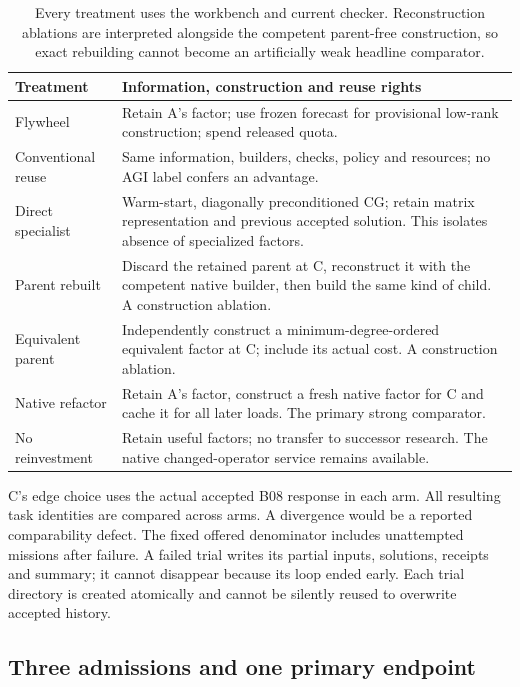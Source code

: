 \begin{table}[htbp]\centering\small
\begin{tabularx}{\linewidth}{@{}L{31mm}Y@{}}\toprule
Treatment & Information, construction and reuse rights \\\midrule
Flywheel & Retain A's factor; use frozen forecast for provisional low-rank construction; spend released quota. \\
Conventional reuse & Same information, builders, checks, policy and resources; no AGI label confers an advantage. \\
Direct specialist & Warm-start, diagonally preconditioned CG; retain matrix representation and previous accepted solution. This isolates absence of specialized factors. \\
Parent rebuilt & Discard the retained parent at C, reconstruct it with the competent native builder, then build the same kind of child. A construction ablation. \\
Equivalent parent & Independently construct a minimum-degree-ordered equivalent factor at C; include its actual cost. A construction ablation. \\
Native refactor & Retain A's factor, construct a fresh native factor for C and cache it for all later loads. The primary strong comparator. \\
No reinvestment & Retain useful factors; no transfer to successor research. The native changed-operator service remains available. \\\bottomrule
\end{tabularx}
\caption{Every treatment uses the workbench and current checker. Reconstruction ablations are interpreted alongside
the competent parent-free construction, so exact rebuilding cannot become an artificially weak headline comparator.}
\end{table}

C's edge choice uses the actual accepted B08 response in each arm. All resulting task identities are compared
across arms. A divergence would be a reported comparability defect. The fixed offered denominator includes
unattempted missions after failure. A failed trial writes its partial inputs, solutions, receipts and summary;
it cannot disappear because its loop ended early. Each trial directory is created atomically and cannot be
silently reused to overwrite accepted history.

\subsection{Three admissions and one primary endpoint}

